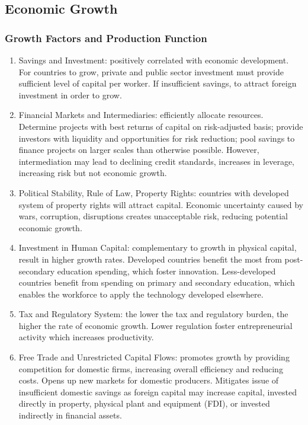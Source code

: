 \subsection{Economic Growth}

\subsubsection{Growth Factors and Production Function}

\begin{remark} 
\begin{enumerate}[label=\roman*.]
\setlength{\itemsep}{0pt}
\item Savings and Investment: positively correlated with economic development.\\
For countries to grow, private and public sector investment must provide sufficient level of capital per worker. If insufficient savings, to attract foreign investment in order to grow.
\item Financial Markets and Intermediaries: efficiently allocate resources. Determine projects with best returns of capital on risk-adjusted basis; provide investors with liquidity and opportunities for risk reduction; pool savings to finance projects on larger scales than otherwise possible. However, intermediation may lead to declining credit standards, increases in leverage, increasing risk but not economic growth.
\item Political Stability, Rule of Law, Property Rights: countries with developed system of property rights will attract capital. Economic uncertainty caused by wars, corruption, disruptions creates unacceptable risk, reducing potential economic growth.
\item Investment in Human Capital: complementary to growth in physical capital, result in higher growth rates. Developed countries benefit the most from post-secondary education spending, which foster innovation. Less-developed countries benefit from spending on primary and secondary education, which enables the workforce to apply the technology developed elsewhere.
\item Tax and Regulatory System: the lower the tax and regulatory burden, the higher the rate of economic growth. Lower regulation foster entrepreneurial activity which increases productivity.
\item Free Trade and Unrestricted Capital Flows: promotes growth by providing competition for domestic firms, increasing overall efficiency and reducing costs. Opens up new markets for domestic producers. Mitigates issue of insufficient domestic savings as foreign capital may increase capital, invested directly in property, physical plant and equipment (FDI), or invested indirectly in financial assets.
\end{enumerate}
\end{remark}

